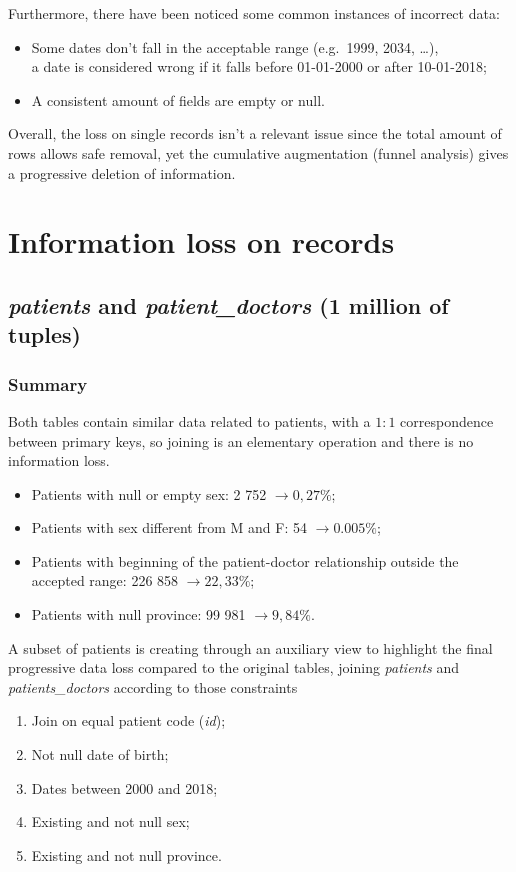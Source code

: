 Furthermore, there have been noticed some common instances of incorrect data:
\begin{itemize}
	\item Some dates don't fall in the acceptable range (e.g.\ 1999, 2034, \dots), \\
	a date is considered wrong if it falls before 01-01-2000 or after 10-01-2018;
	\item A consistent amount of fields are empty or null.
\end{itemize}

Overall, the loss on single records isn't a relevant issue since the total amount of rows allows safe removal, yet the cumulative augmentation (funnel analysis) gives a progressive deletion of information.

\section{Information loss on records}

\subsection{\textit{patients} and \textit{patient\_doctors} (1 million of tuples)}
\subsubsection{Summary}
Both tables contain similar data related to patients, with a $1 : 1$ correspondence between primary keys, so joining is an elementary operation and there is no information loss.

\begin{itemize}
	\item Patients with null or empty sex: 2 752 $\rightarrow 0,27\%$;
	\item Patients with sex different from M and F: 54 $\rightarrow 0.005\%$;
	\item Patients with beginning of the patient-doctor relationship outside the accepted range: 226 858 $\rightarrow 22,33\%$;
	\item Patients with null province: 99 981 $\rightarrow 9,84\%$.
\end{itemize}

A subset of patients is creating through an auxiliary view to highlight the final progressive data loss compared to the original tables, joining \textit{patients} and \textit{patients\_doctors} according to those constraints
\begin{enumerate}
	\item Join on equal patient code (\textit{id});
	\item Not null date of birth;
	\item Dates between 2000 and 2018;
	\item Existing and not null sex;
	\item Existing and not null province.
\end{enumerate}

